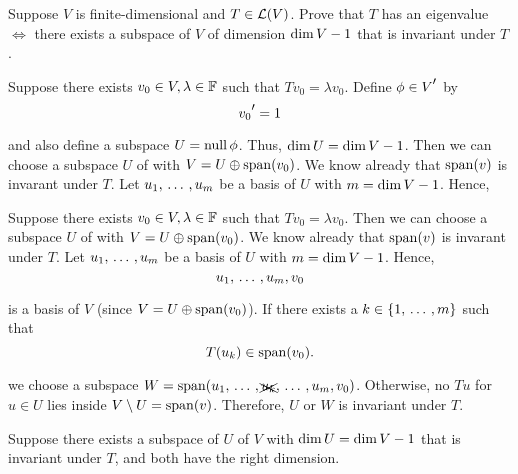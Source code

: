 \begin{xrcs}
  Suppose $V$ is finite-dimensional and $T \in \mathcal{L}(V)$. Prove that $T$ has an eigenvalue $\iff$ there exists a subspace of $V$ of dimension $\operatorname{dim} V - 1$ that is invariant under $T$.

  \begin{xprf}
    Suppose there exists $v_0 \in V, \lambda \in \mathbb{F}$ such that $Tv_0 = \lambda v_0$. Define $\phi \in \dual{V}$ by
    \begin{equation}
      \dual{v_0} = 1
    \end{equation}

    and also define a subspace $U = \operatorname{null} \phi$. Thus, $\operatorname{dim} U = \operatorname{dim} V - 1$.
    Then we can choose a subspace $U$ of with $V = U \oplus \operatorname{span} (v_0)$. We know already that $\operatorname{span} (v)$ is invarant under $T$. Let $u_1, {\, \ldots \,\,}, u_{m}$ be a basis of $U$ with $m = \operatorname{dim} V - 1$. Hence,
  \end{xprf}

  \begin{xprf}
    \Rightarrowdirection Suppose there exists $v_0 \in V, \lambda \in \mathbb{F}$ such that $Tv_0 = \lambda v_0$. Then we can choose a subspace $U$ of with $V = U \oplus \operatorname{span} (v_0)$. We know already that $\operatorname{span} (v)$ is invarant under $T$. Let $u_1, {\, \ldots \,\,}, u_{m}$ be a basis of $U$ with $m = \operatorname{dim} V - 1$. Hence,
    \begin{equation}
      u_1, {\, \ldots \,\,}, u_{m}, v_0
    \end{equation}

    is a basis of $V$ (since $V = U \oplus \operatorname{span} (v_0)$). If there exists a $k \in \{1, {\, \ldots \,\,}, m\}$ such that
    \begin{equation}
      T(u_k) \in \operatorname{span} (v_0).
    \end{equation}

    we choose a subspace $W = \operatorname{span} (u_1, {\, \ldots \,\,}, \xcancel{u_k}, {\, \ldots \,\,}, u_m, v_0)$. Otherwise, no $T u$ for $u \in U$ lies inside $V \setminus U = \operatorname{span} (v)$. Therefore, $U$ or $W$ is invariant under $T$.

    \Leftarrowdirection Suppose there exists a subspace of $U$ of $V$ with $\operatorname{dim} U = \operatorname{dim} V - 1$ that is invariant under $T$, and both have the right dimension.
  \end{xprf}
\end{xrcs}

